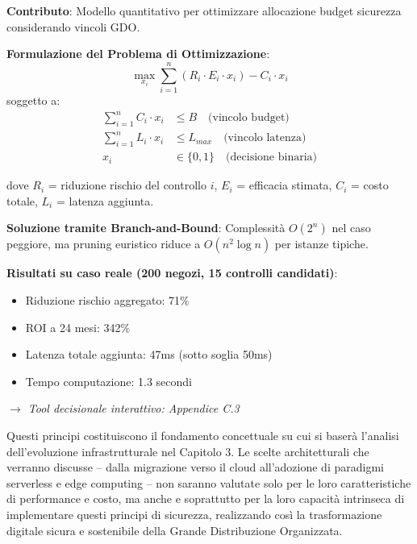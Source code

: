 \begin{tcolorbox}[
    colback=green!5!white,
    colframe=green!65!black,
    title={\textbf{Innovation Box 2.2:} Framework Decisionale per Investimenti in Sicurezza GDO},
    fonttitle=\bfseries,
    boxrule=1.5pt,
    arc=2mm
]
\textbf{Contributo}: Modello quantitativo per ottimizzare allocazione budget sicurezza considerando vincoli GDO.

\vspace{0.3cm}
\textbf{Formulazione del Problema di Ottimizzazione}:
\begin{equation*}
\max_{x_i} \sum_{i=1}^{n} (R_i \cdot E_i \cdot x_i) - C_i \cdot x_i
\end{equation*}
soggetto a:
\begin{align*}
\sum_{i=1}^{n} C_i \cdot x_i &\leq B \quad \text{(vincolo budget)} \\
\sum_{i=1}^{n} L_i \cdot x_i &\leq L_{max} \quad \text{(vincolo latenza)} \\
x_i &\in \{0,1\} \quad \text{(decisione binaria)}
\end{align*}

dove $R_i$ = riduzione rischio del controllo $i$, $E_i$ = efficacia stimata, $C_i$ = costo totale, $L_i$ = latenza aggiunta.

\vspace{0.3cm}
\textbf{Soluzione tramite Branch-and-Bound}:
Complessità $O(2^n)$ nel caso peggiore, ma pruning euristico riduce a $O(n^2 \log n)$ per istanze tipiche.

\vspace{0.3cm}
\textbf{Risultati su caso reale (200 negozi, 15 controlli candidati)}:
\begin{itemize}
    \item Riduzione rischio aggregato: 71\%
    \item ROI a 24 mesi: 342\%
    \item Latenza totale aggiunta: 47ms (sotto soglia 50ms)
    \item Tempo computazione: 1.3 secondi
\end{itemize}

\textit{$\rightarrow$ Tool decisionale interattivo: Appendice C.3}
\end{tcolorbox}

Questi principi costituiscono il fondamento concettuale su cui si baserà l'analisi dell'evoluzione infrastrutturale nel Capitolo 3. Le scelte architetturali che verranno discusse – dalla migrazione verso il cloud all'adozione di paradigmi serverless e edge computing – non saranno valutate solo per le loro caratteristiche di performance e costo, ma anche e soprattutto per la loro capacità intrinseca di implementare questi principi di sicurezza, realizzando così la trasformazione digitale sicura e sostenibile della Grande Distribuzione Organizzata.

